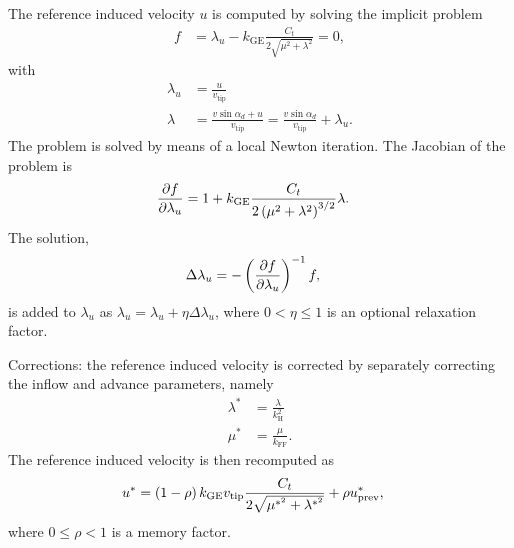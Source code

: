 The reference induced velocity $u$ is computed by solving the implicit problem
\begin{align}
	f
	&=
	\lambda_u
	- k_\text{GE} \frac{C_t}{2\sqrt{\mu^2 + \lambda^2}}
	=
	0
	,
\end{align}
with
\begin{subequations}
\begin{align}
	\lambda_u
	&=
	\frac{u}{v_\text{tip}}
	\\
	\lambda
	&=
	\frac{v \sin\alpha_d + u}{v_\text{tip}}
	=
	\frac{v \sin\alpha_d}{v_\text{tip}}
	+ \lambda_u
	.
\end{align}
\end{subequations}
The problem is solved by means of a local Newton iteration.
The Jacobian of the problem is
\begin{align}
	\frac{\partial f}{\partial \lambda_u}
	&=
	1 + k_\text{GE} \frac{C_t}{2 \left( \mu^2 + \lambda^2 \right)^{3/2}} \lambda
	.
\end{align}
The solution,
\begin{align}
	\Delta\lambda_u
	&=
	- \left( \frac{\partial f}{\partial \lambda_u} \right)^{-1} f
	,
\end{align}
is added to $\lambda_u$ as
$\lambda_u = \lambda_u + \eta \Delta\lambda_u$,
where $0 < \eta \le 1$ is an optional relaxation factor.

Corrections:
the reference induced velocity is corrected by separately correcting
the inflow and advance parameters, namely
\begin{subequations}
\begin{align}
	\lambda^*
	&=
	\frac{\lambda}{k_\text{H}^2}
	\\
	\mu^*
	&=
	\frac{\mu}{k_\text{FF}}
	.
\end{align}
\end{subequations}
The reference induced velocity is then recomputed as
\begin{align}
	u^*
	&=
	\left( 1 - \rho \right) k_\text{GE} v_\text{tip}
		\frac{C_t}{2 \sqrt{\mu^{*^2} + \lambda^{*^2}}}
	+ \rho u^*_\text{prev}
	,
\end{align}
where $0 \le \rho < 1$ is a memory factor.
